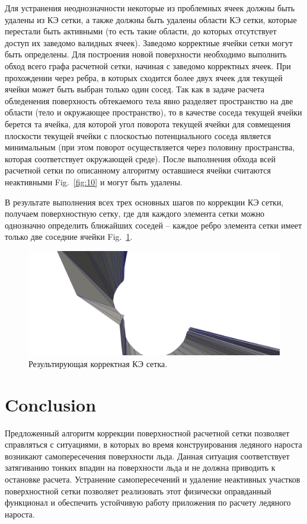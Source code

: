 \documentclass[
11pt,%
tightenlines,%
twoside,%
onecolumn,%
nofloats,%
nobibnotes,%
nofootinbib,%
superscriptaddress,%
noshowpacs,%
centertags]%
{revtex4}
\begin{document}
Для устранения неоднозначности некоторые из проблемных ячеек должны быть удалены из КЭ сетки, а также должны быть удалены области КЭ сетки, которые перестали быть активными (то есть такие области, до которых отсутствует доступ их заведомо валидных ячеек). Заведомо корректные ячейки сетки могут быть определены. Для построения новой поверхности необходимо выполнить обход всего графа расчетной сетки, начиная с заведомо корректных ячеек. При прохождении через ребра, в которых сходится более двух ячеек для текущей ячейки может быть выбран только один сосед. Так как в задаче расчета обледенения поверхность обтекаемого тела явно разделяет пространство на две области (тело и окружающее пространство), то в качестве соседа текущей ячейки берется та ячейка, для которой угол поворота текущей ячейки для совмещения плоскости текущей ячейки с плоскостью потенциального соседа является минимальным (при этом поворот осуществляется через половину пространства, которая соответствует окружающей среде). После выполнения обхода всей расчетной сетки по описанному алгоритму оставшиеся ячейки считаются неактивными Fig.~\ref{fig:10} и могут быть удалены.

В результате выполнения всех трех основных шагов по коррекции КЭ сетки, получаем поверхностную сетку, где для каждого элемента сетки можно однозначно определить ближайших соседей – каждое ребро элемента сетки имеет только две соседние ячейки Fig.~\ref{fig:11}.

\begin{figure}[h]
\includegraphics[width=1.0\textwidth]{pics/pic_11.png}
\caption{Результирующая корректная КЭ сетка.}\label{fig:11}
\end{figure}

\section{Conclusion}

Предложенный алгоритм коррекции поверхностной расчетной сетки позволяет справляться с ситуациями, в которых во время конструирования ледяного нароста возникают самопересечения поверхности льда. Данная ситуация соответствует затягиванию тонких впадин на поверхности льда и не должна приводить к остановке расчета. Устранение самопересечений и удаление неактивных участков поверхностной сетки позволяет реализовать этот физически оправданный функционал и обеспечить устойчивую работу приложения по расчету ледяного нароста.
\end{document}

